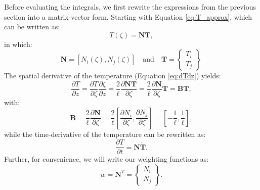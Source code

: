 \documentclass[10pt, a4paper, twoside, headinclude,footinclude, BCOR5mm]{scrartcl}
\begin{document}
\begin{tcolorbox}[colback=gray!5,colframe=gray!40!black,title=Matrix-vector notation]
Before evaluating the integrals, we first rewrite the expressions from the previous section into a matrix-vector form. Starting with Equation \ref{eq:T_approx}, which can be written as:
\begin{equation*}
  T(\zeta) = \mathbf{N}\mathbf{T},
\end{equation*}
in which:
\begin{equation*}
\mathbf{N} = [N_i(\zeta), N_j(\zeta)] \quad\text{and}\quad
\mathbf{T} = \begin{Bmatrix} T_i \\ T_j \end{Bmatrix} \,
\end{equation*}
The spatial derivative of the temperature (Equation \ref{eq:dTdz}) yields:
\begin{equation*}
  \frac{\partial T}{\partial z} =
  \frac{\partial T}{\partial \zeta}\frac{\partial \zeta}{\partial z} =
  \frac{2}{\ell}\frac{\partial\mathbf{N}\mathbf{T}}{\partial \zeta} =
  \frac{2}{\ell}\frac{\partial \mathbf{N}}{\partial\zeta} \mathbf{T} =
  \mathbf{B}\mathbf{T},
\end{equation*}
with:
\begin{equation*}
  \mathbf{B} = \frac{2}{\ell}\frac{\partial \mathbf{N}}{\partial\zeta}= \frac{2}{\ell}
  \left[\frac{\partial N_i}{\partial \zeta}, \frac{\partial N_j}{\partial \zeta}\right] =
  \left[-\frac{1}{\ell}, \frac{1}{\ell}\right],
\end{equation*}
while the time-derivative of the temperature can be rewritten as:
\begin{equation*}
  \frac{\partial T}{\partial t} =
  \mathbf{N}\mathbf{\dot{T}}.
\end{equation*}
Further, for convenience, we will write our weighting functions as:
\begin{equation*}
  w = \mathbf{N}^T = \begin{Bmatrix} N_i \\ N_j \end{Bmatrix}.
\end{equation*}
\end{tcolorbox}
\end{document}
